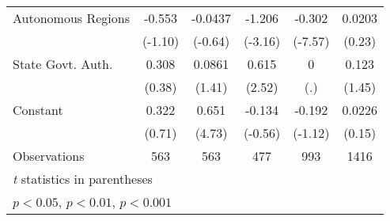 \begin{table}[htbp]
\begin{tabular}{l*{5}{c}}
\addlinespace
Autonomous Regions                      &   -0.553         &  -0.0437         &   -1.206\sym{**} &   -0.302\sym{***}&   0.0203         \\
                                        &  (-1.10)         &  (-0.64)         &  (-3.16)         &  (-7.57)         &   (0.23)         \\
\addlinespace
State Govt. Auth.                       &    0.308         &   0.0861         &    0.615\sym{*}  &        0         &    0.123         \\
                                        &   (0.38)         &   (1.41)         &   (2.52)         &      (.)         &   (1.45)         \\
\addlinespace
Constant                                &    0.322         &    0.651\sym{***}&   -0.134         &   -0.192         &   0.0226         \\
                                        &   (0.71)         &   (4.73)         &  (-0.56)         &  (-1.12)         &   (0.15)         \\
\midrule
Observations                            &      563         &      563         &      477         &      993         &     1416         \\
\bottomrule
\multicolumn{6}{l}{\footnotesize \textit{t} statistics in parentheses}\\
\multicolumn{6}{l}{\footnotesize \sym{*} \(p<0.05\), \sym{**} \(p<0.01\), \sym{***} \(p<0.001\)}\\
\end{tabular}
\end{table}
